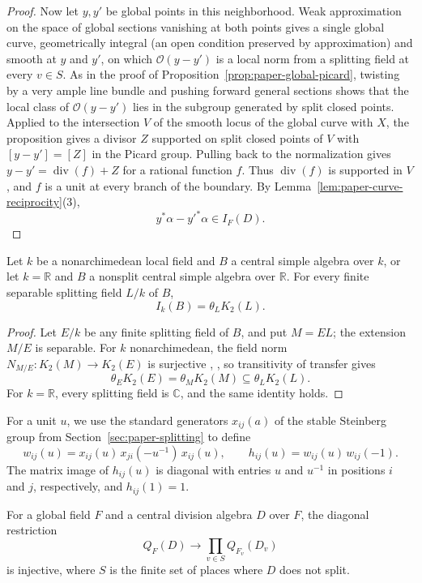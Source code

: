 \begin{proof}
Now let $y,y'$ be global points in this neighborhood.
Weak approximation on the space of global sections vanishing at both points gives a single global curve, geometrically integral (an open condition preserved by approximation) and smooth at $y$ and $y'$, on which $\mathcal O(y-y')$ is a local norm from a splitting field at every $v\in S$.
As in the proof of Proposition~\ref{prop:paper-global-picard}, twisting by a very ample line bundle and pushing forward general sections shows that the local class of $\mathcal O(y-y')$ lies in the subgroup generated by split closed points.
Applied to the intersection $V$ of the smooth locus of the global curve with $X$, the proposition gives a divisor $Z$ supported on split closed points of $V$ with $[y-y']=[Z]$ in the Picard group.
Pulling back to the normalization gives $y-y'=\operatorname{div}(f)+Z$ for a rational function $f$.
Thus $\operatorname{div}(f)$ is supported in $V$, and $f$ is a unit at every branch of the boundary.
By Lemma~\ref{lem:paper-curve-reciprocity}(3),
\[
 y^*\alpha-y'^*\alpha\in I_F(D).
\]
\end{proof}


\begin{lemma}\label{lem:paper-local-I-single-field}
Let $k$ be a nonarchimedean local field and $B$ a central simple algebra over $k$, or let $k=\mathbb R$ and $B$ a nonsplit central simple algebra over $\mathbb R$.
For every finite separable splitting field $L/k$ of $B$,
\[
 I_k(B)=\theta_LK_2(L).
\]
\end{lemma}
\begin{proof}
Let $E/k$ be any finite splitting field of $B$, and put $M=EL$; the extension $M/E$ is separable.
For $k$ nonarchimedean, the field norm $N_{M/E}\colon K_2(M)\to K_2(E)$ is surjective \cite{BassTate}, \cite[p.~4]{BakRehmann1984}, so transitivity of transfer gives
\[
 \theta_E K_2(E)=\theta_M K_2(M)\subseteq\theta_LK_2(L).
\]
For $k=\mathbb R$, every splitting field is $\mathbb C$, and the same identity holds.
\end{proof}

For a unit $u$, we use the standard generators $x_{ij}(a)$ of the stable Steinberg group from Section~\ref{sec:paper-splitting} to define
\[
 w_{ij}(u)=x_{ij}(u)\,x_{ji}(-u^{-1})\,x_{ij}(u),\qquad h_{ij}(u)=w_{ij}(u)\,w_{ij}(-1).
\]
The matrix image of $h_{ij}(u)$ is diagonal with entries $u$ and $u^{-1}$ in positions $i$ and $j$, respectively, and $h_{ij}(1)=1$.

\begin{theorem}\label{thm:paper-Q-local-global}
For a global field $F$ and a central division algebra $D$ over $F$, the diagonal restriction
\[
 Q_F(D)\longrightarrow\prod_{v\in S}Q_{F_v}(D_v)
\]
is injective, where $S$ is the finite set of places where $D$ does not split.
\end{theorem}

